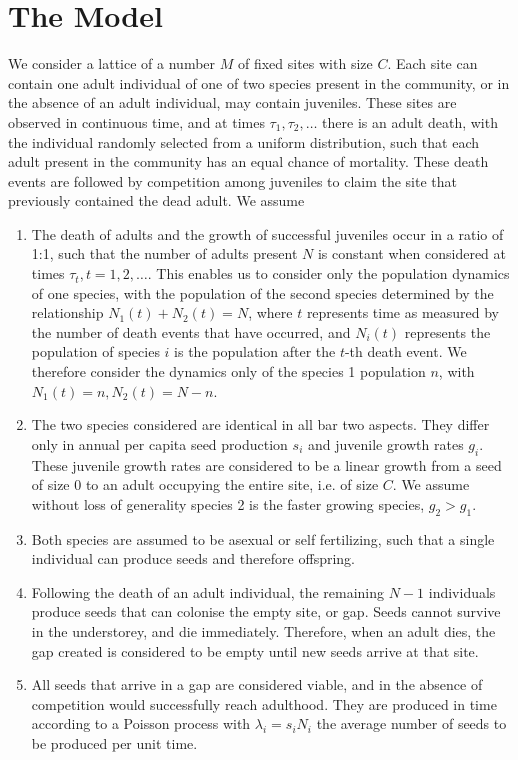 \documentclass[a4paper]{article}
\begin{document}
\section{The Model}
\label{model}
We consider a lattice of a number $M$ of fixed sites with size $C$. Each site can contain one adult individual of one of two species present in the community, or in the absence of an adult individual, may contain juveniles. These sites are observed in continuous time, and at times $\tau_1,\tau_2,\dots$ there is an adult death, with the individual randomly selected from a uniform distribution, such that each adult present in the community has an equal chance of mortality. These death events are followed by competition among juveniles to claim the site that previously contained the dead adult. We assume
\begin{enumerate}
\item The death of adults and the growth of successful juveniles occur in a ratio of 1:1, such that the number of adults present $N$ is constant when considered at times $\tau_t,t=1,2,\dots$. This enables us to consider only the population dynamics of one species, with the population of the second species determined by the relationship $N_1(t) + N_2(t) = N$, where $t$ represents time as measured by the number of death events that have occurred, and $N_i(t)$ represents the population of species $i$ is the population after the $t$-th death event. We therefore consider the dynamics only of the species 1 population $n$, with $N_1(t)=n, N_2(t)=N-n$.
\item The two species considered are identical in all bar two aspects. They differ only in annual per capita seed production $s_i$ and juvenile growth rates $g_i$. These juvenile growth rates are considered to be a linear growth from a seed of size $0$ to an adult occupying the entire site, i.e. of size $C$. We assume without loss of generality species 2 is the faster growing species, $g_2>g_1$.
\item Both species are assumed to be asexual or self fertilizing, such that a single individual can produce seeds and therefore offspring.
\item Following the death of an adult individual, the remaining $N-1$ individuals produce seeds that can colonise the empty site, or gap. Seeds cannot survive in the understorey, and die immediately. Therefore, when an adult dies, the gap created is considered to be empty until new seeds arrive at that site.
\item All seeds that arrive in a gap are considered viable, and in the absence of competition would successfully reach adulthood. They are produced in time according to a Poisson process with $\lambda_i =  s_i N_i$ the average number of seeds to be produced per unit time.

\end{enumerate}
\end{document}
